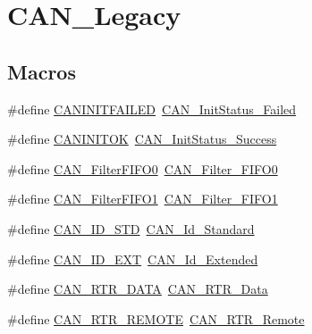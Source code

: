 \hypertarget{group___c_a_n___legacy}{}\section{C\+A\+N\+\_\+\+Legacy}
\label{group___c_a_n___legacy}
\subsection*{Macros}
\begin{DoxyCompactItemize}
\item 
\#define \hyperlink{group___c_a_n___legacy_ga0539a9e5a898fcd71c4dcb7e341e4b86}{C\+A\+N\+I\+N\+I\+T\+F\+A\+I\+L\+ED}~\hyperlink{group___c_a_n__sleep__constants_ga095c319e8c54c974eb2b6eeadf180d96}{C\+A\+N\+\_\+\+Init\+Status\+\_\+\+Failed}
\item 
\#define \hyperlink{group___c_a_n___legacy_ga14cba0b5b506be73e2f45c732f8e54cb}{C\+A\+N\+I\+N\+I\+T\+OK}~\hyperlink{group___c_a_n__sleep__constants_ga6bed5957af8f2f6b00568e15ccac5772}{C\+A\+N\+\_\+\+Init\+Status\+\_\+\+Success}
\item 
\#define \hyperlink{group___c_a_n___legacy_ga1b3d041dff9fed4dad75ed2a4a0e27e0}{C\+A\+N\+\_\+\+Filter\+F\+I\+F\+O0}~\hyperlink{group___c_a_n__filter___f_i_f_o_ga8249c27978ca94676530540b88a6be8f}{C\+A\+N\+\_\+\+Filter\+\_\+\+F\+I\+F\+O0}
\item 
\#define \hyperlink{group___c_a_n___legacy_gada8f9b3a9c88f36539aaeb457039e666}{C\+A\+N\+\_\+\+Filter\+F\+I\+F\+O1}~\hyperlink{group___c_a_n__filter___f_i_f_o_gaab8478c89a607c4b8baf68efc730e316}{C\+A\+N\+\_\+\+Filter\+\_\+\+F\+I\+F\+O1}
\item 
\#define \hyperlink{group___c_a_n___legacy_ga284ca16658deb9d0c21f4ddc6db14833}{C\+A\+N\+\_\+\+I\+D\+\_\+\+S\+TD}~\hyperlink{group___c_a_n__identifier__type_ga151d9df8a6f361d0a3231593726b5a13}{C\+A\+N\+\_\+\+Id\+\_\+\+Standard}
\item 
\#define \hyperlink{group___c_a_n___legacy_ga5f6fdd1dc3d312af1ac30e2eee15d6f0}{C\+A\+N\+\_\+\+I\+D\+\_\+\+E\+XT}~\hyperlink{group___c_a_n__identifier__type_gaf6c5c0b43b968fed17fd90246912b1a7}{C\+A\+N\+\_\+\+Id\+\_\+\+Extended}
\item 
\#define \hyperlink{group___c_a_n___legacy_gab1e89074b4fcfebf81c323909625b0d0}{C\+A\+N\+\_\+\+R\+T\+R\+\_\+\+D\+A\+TA}~\hyperlink{group___c_a_n__remote__transmission__request_ga2407c3a8b2cd97bd651143aa959219f1}{C\+A\+N\+\_\+\+R\+T\+R\+\_\+\+Data}
\item 
\#define \hyperlink{group___c_a_n___legacy_gab15c649e3e497c6d1145bb98ff7f3f04}{C\+A\+N\+\_\+\+R\+T\+R\+\_\+\+R\+E\+M\+O\+TE}~\hyperlink{group___c_a_n__remote__transmission__request_ga42e95ddfb02d88c82de84058fb0fb349}{C\+A\+N\+\_\+\+R\+T\+R\+\_\+\+Remote}

\end{DoxyCompactItemize}
